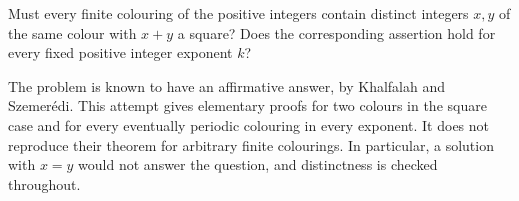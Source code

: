 Must every finite colouring of the positive integers contain distinct integers $x,y$ of the same colour with $x+y$ a square? Does the corresponding assertion hold for every fixed positive integer exponent $k$?

The problem is known to have an affirmative answer, by Khalfalah and Szemer\'edi. This attempt gives elementary proofs for two colours in the square case and for every eventually periodic colouring in every exponent. It does not reproduce their theorem for arbitrary finite colourings. In particular, a solution with $x=y$ would not answer the question, and distinctness is checked throughout.

